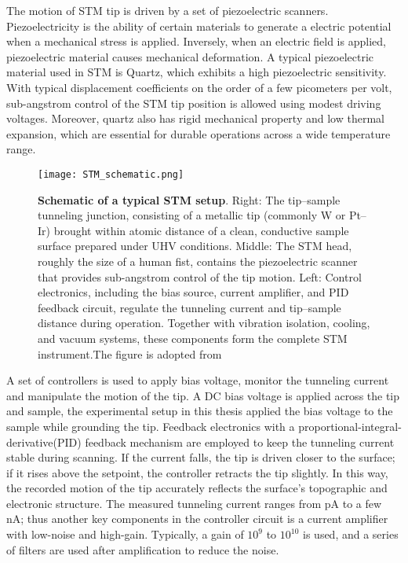 The motion of STM tip is driven by a set of piezoelectric scanners. Piezoelectricity is the ability of certain materials to generate a electric potential when a mechanical stress is applied. Inversely, when an electric field is applied, piezoelectric material causes mechanical deformation. A typical piezoelectric material used in STM is Quartz, which exhibits a high piezoelectric sensitivity. With typical displacement coefficients on the order of a few picometers per volt, sub-angstrom control of the STM tip position is allowed using modest driving voltages. Moreover, quartz also has rigid mechanical property and low thermal expansion, which are essential for durable operations across a wide temperature range.
 \begin{figure}
 	\centering
 	\texttt{[image: STM\_schematic.png]}
 	\caption[\textbf{Schematic of a typical STM setup}]{\textbf{Schematic of a typical STM setup}. Right: The tip–sample tunneling junction, consisting of a metallic tip (commonly W or Pt–Ir) brought within atomic distance of a clean, conductive sample surface prepared under UHV conditions. Middle: The STM head, roughly the size of a human fist, contains the piezoelectric scanner that provides sub-angstrom control of the tip motion. Left: Control electronics, including the bias source, current amplifier, and PID feedback circuit, regulate the tunneling current and tip–sample distance during operation. Together with vibration isolation, cooling, and vacuum systems, these components form the complete STM instrument.The figure is adopted from \cite{stuartScanningTunnellingMicroscopy2021}}
 	\label{fig:stm_schematics}
 \end{figure}
 
A set of controllers is used to apply bias voltage, monitor the tunneling current and manipulate the motion of the tip. A DC bias voltage is applied across the tip and sample, the experimental setup in this thesis applied the bias voltage to the sample while grounding the tip. Feedback electronics with a proportional-integral-derivative(PID) feedback mechanism are employed to keep the tunneling current stable during scanning. If the current falls, the tip is driven closer to the surface; if it rises above the setpoint, the controller retracts the tip slightly. In this way, the recorded motion of the tip accurately reflects the surface's topographic and electronic structure. The measured tunneling current ranges from pA to a few nA; thus another key components in the controller circuit is a current amplifier with low-noise and high-gain. Typically, a gain of $10^9$ to $10^10$ is used, and a series of filters are used after amplification to reduce the noise. 

